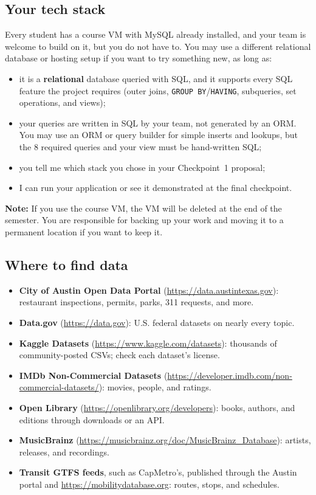 \documentclass[11pt]{article}
\begin{document}
\subsection*{Your tech stack}

Every student has a course VM with MySQL already installed, and your team is welcome to build on it, but you do not have to. You may use a different relational database or hosting setup if you want to try something new, as long as:
\begin{itemize}
  \item it is a \textbf{relational} database queried with SQL, and it supports every SQL feature the project requires (outer joins, \texttt{GROUP BY}/\texttt{HAVING}, subqueries, set operations, and views);
  \item your queries are written in SQL by your team, not generated by an ORM. You may use an ORM or query builder for simple inserts and lookups, but the 8 required queries and your view must be hand-written SQL;
  \item you tell me which stack you chose in your Checkpoint~1 proposal;
  \item I can run your application or see it demonstrated at the final checkpoint.
\end{itemize}

\noindent \textbf{Note:} If you use the course VM, the VM will be deleted at the end of the semester. You are responsible for backing up your work and moving it to a permanent location if you want to keep it.

\subsection*{Where to find data}
\begin{itemize}
  \item \textbf{City of Austin Open Data Portal} (\url{https://data.austintexas.gov}): restaurant inspections, permits, parks, 311 requests, and more.
  \item \textbf{Data.gov} (\url{https://data.gov}): U.S. federal datasets on nearly every topic.
  \item \textbf{Kaggle Datasets} (\url{https://www.kaggle.com/datasets}): thousands of community-posted CSVs; check each dataset's license.
  \item \textbf{IMDb Non-Commercial Datasets} (\url{https://developer.imdb.com/non-commercial-datasets/}): movies, people, and ratings.
  \item \textbf{Open Library} (\url{https://openlibrary.org/developers}): books, authors, and editions through downloads or an API.
  \item \textbf{MusicBrainz} (\url{https://musicbrainz.org/doc/MusicBrainz_Database}): artists, releases, and recordings.
  \item \textbf{Transit GTFS feeds}, such as CapMetro's, published through the Austin portal and \url{https://mobilitydatabase.org}: routes, stops, and schedules.
\end{itemize}
\end{document}
